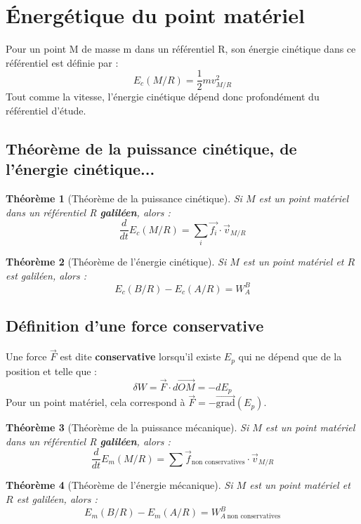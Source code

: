 \documentclass[french]{book}
\theoremstyle{plain}
\newtheorem{thm}{Théorème}
\theoremstyle{definition}
\theoremstyle{remark}
\newcommand{\grad}{\overrightarrow{\text{grad}}}
\begin{document}
\section{Énergétique du point matériel}
Pour un point M de masse m dans un référentiel R, son énergie cinétique dans ce référentiel est définie par : $$E_c(M/R)=\frac{1}{2}mv_{M/R}^2$$
Tout comme la vitesse, l'énergie cinétique dépend donc profondément du référentiel d'étude.
\subsection{Théorème de la puissance cinétique, de l'énergie cinétique...}
\begin{thm}[Théorème de la puissance cinétique]
	Si $M$ est un point matériel dans un référentiel R \textbf{galiléen}, alors : $$\frac{d}{dt}E_c(M/R)=\sum_i \overrightarrow{f_i}\cdot\overrightarrow{v}_{M/R}$$
\end{thm}
\begin{thm}[Théorème de l'énergie cinétique]
	Si $M$ est un point matériel et $R$ est galiléen, alors : $$E_c(B/R)-E_c(A/R)=W_A^B$$
\end{thm}
\subsection{Définition d'une force conservative}
Une force $\overrightarrow{F}$ est dite \textbf{conservative} lorsqu'il existe $E_p$ qui ne dépend que de la position et telle que : $$\delta W =\overrightarrow{F}\cdot d\overrightarrow{OM}=-dE_p$$ Pour un point matériel, cela correspond à $\overrightarrow{F}=-\grad(E_p)$.
\begin{thm}[Théorème de la puissance mécanique]
	Si $M$ est un point matériel dans un référentiel R \textbf{galiléen}, alors : $$\frac{d}{dt}E_m(M/R)=\sum \overrightarrow{f}_{\text{non conservatives}}\cdot\overrightarrow{v}_{M/R}$$
\end{thm}
\begin{thm}[Théorème de l'énergie mécanique]
	Si $M$ est un point matériel et $R$ est galiléen, alors : $$E_m(B/R)-E_m(A/R)=W_{A \ \text{non conservatives}}^B$$
\end{thm}
\end{document}
